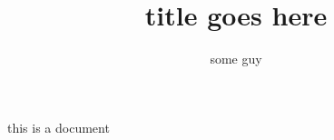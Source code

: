 \documentclass[manuscript]{clv3}
\title{title goes here}
\author{some guy}
\begin{document}
this is a document
\end{document}

